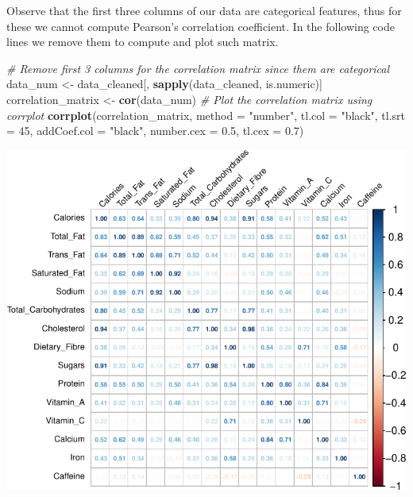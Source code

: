 \documentclass[
]{article}
\newenvironment{Shaded}{\begin{snugshade}}{\end{snugshade}}
\newcommand{\AttributeTok}[1]{\textcolor[rgb]{0.13,0.29,0.53}{#1}}
\newcommand{\CommentTok}[1]{\textcolor[rgb]{0.56,0.35,0.01}{\textit{#1}}}
\newcommand{\DecValTok}[1]{\textcolor[rgb]{0.00,0.00,0.81}{#1}}
\newcommand{\FloatTok}[1]{\textcolor[rgb]{0.00,0.00,0.81}{#1}}
\newcommand{\FunctionTok}[1]{\textcolor[rgb]{0.13,0.29,0.53}{\textbf{#1}}}
\newcommand{\NormalTok}[1]{#1}
\newcommand{\OtherTok}[1]{\textcolor[rgb]{0.56,0.35,0.01}{#1}}
\newcommand{\StringTok}[1]{\textcolor[rgb]{0.31,0.60,0.02}{#1}}
\begin{document}
Observe that the first three columns of our data are categorical
features, thus for these we cannot compute Pearson's correlation
coefficient. In the following code lines we remove them to compute and
plot such matrix.

\begin{Shaded}
\begin{Highlighting}[]
\CommentTok{\# Remove first 3 columns for the correlation matrix since them are categorical}
\NormalTok{data\_num }\OtherTok{\textless{}{-}}\NormalTok{ data\_cleaned[, }\FunctionTok{sapply}\NormalTok{(data\_cleaned, is.numeric)]}
\NormalTok{correlation\_matrix }\OtherTok{\textless{}{-}} \FunctionTok{cor}\NormalTok{(data\_num)}
\CommentTok{\# Plot the correlation matrix using corrplot}
\FunctionTok{corrplot}\NormalTok{(correlation\_matrix, }\AttributeTok{method =} \StringTok{"number"}\NormalTok{, }\AttributeTok{tl.col =} \StringTok{"black"}\NormalTok{, }
         \AttributeTok{tl.srt =} \DecValTok{45}\NormalTok{, }\AttributeTok{addCoef.col =} \StringTok{"black"}\NormalTok{, }\AttributeTok{number.cex =} \FloatTok{0.5}\NormalTok{, }\AttributeTok{tl.cex =} \FloatTok{0.7}\NormalTok{)}
\end{Highlighting}
\end{Shaded}

\begin{center}\includegraphics{Statistical_Learning_Final_Report_files/figure-latex/correlation_analysis-1} \end{center}
\end{document}

